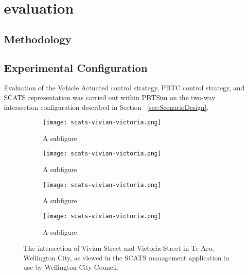 \chapter{evaluation}

\section{Methodology}

\section{Experimental Configuration}

Evaluation of the Vehicle Actuated control strategy, PBTC control strategy, and SCATS representation was carried out within PBTSim on the two-way intersection configuration described in Section ~\ref{sec:ScenarioDesign}.



\begin{figure}
\centering
\begin{subfigure}{.5\textwidth}
  \centering
  \texttt{[image: scats-vivian-victoria.png]}
  \caption{A subfigure}
  \label{fig:sub1}
\end{subfigure}%
\begin{subfigure}{.5\textwidth}
  \centering
  \texttt{[image: scats-vivian-victoria.png]}
  \caption{A subfigure}
  \label{fig:sub2}
\end{subfigure}

\vspace{1cm}

\begin{subfigure}{.5\textwidth}
  \centering
  \texttt{[image: scats-vivian-victoria.png]}
  \caption{A subfigure}
  \label{fig:sub1}
\end{subfigure}%
\begin{subfigure}{.5\textwidth}
  \centering
  \texttt{[image: scats-vivian-victoria.png]}
  \caption{A subfigure}
  \label{fig:sub2}
\end{subfigure}
\caption{The intersection of Vivian Street and Victoria Street in Te Aro, Wellington City, as viewed in the SCATS management application in use by Wellington City Council. }
\label{fig:test}
\end{figure}
